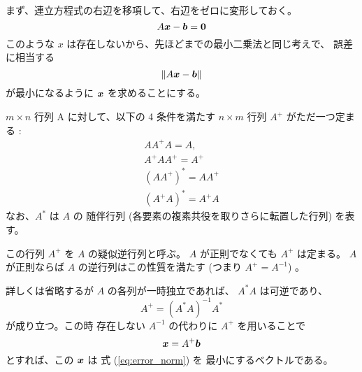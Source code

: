 \documentclass[12pt]{jsarticle}
\begin{document}
まず、連立方程式の右辺を移項して、右辺をゼロに変形しておく。
\begin{equation}
  A \bm{x} - \bm{b} = \bm{0}
\end{equation}
このような $x$ は存在しないから、先ほどまでの最小二乗法と同じ考えで、
誤差に相当する
\begin{equation}
  \| A \bm{x} - \bm{b} \| \label{eq:error_norm}
\end{equation}
が最小になるように $\bm{x}$ を求めることにする。

$m \times n$ 行列 A に対して、以下の 4 条件を満たす $n \times m$ 行列
$A^{+}$ がただ一つ定まる :
\begin{eqnarray}
  A A^{+} A = A, \\
  A^{+} A A^{+} = A^{+} \\
  (A A^{+})^{*} = A A^{+} \\
  (A^{+} A)^{*} = A^{+} A
\end{eqnarray}
なお、$A^{*}$ は $A$ の
随伴行列 (各要素の複素共役を取りさらに転置した行列) を表す。

この行列 $A^{+}$ を $A$ の疑似逆行列と呼ぶ。
$A$ が正則でなくても $A^{+}$ は定まる。
$A$ が正則ならば $A$ の逆行列はこの性質を満たす (つまり $A^{+} = A^{-1}$) 。

詳しくは省略するが $A$ の各列が一時独立であれば、
$A^{*} A$ は可逆であり、
\begin{equation}
  A^{+} = \left( A^{*} A \right)^{-1} A^{*}
\end{equation}
が成り立つ。この時 存在しない $A^{-1}$ の代わりに $A^{+}$ を用いることで
\begin{equation}
  \bm{x} = A^{+} \bm{b}
\end{equation}
とすれば、この $\bm{x}$ は 式 (\ref{eq:error_norm}) を
最小にするベクトルである。
\end{document}
